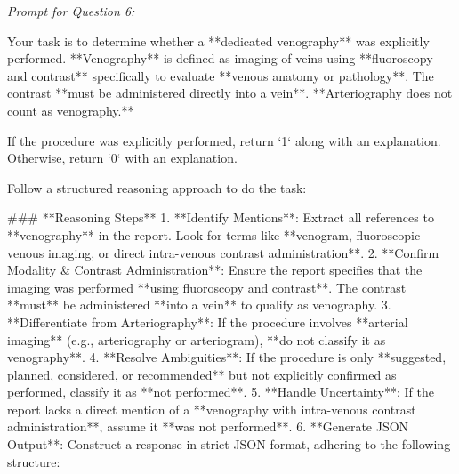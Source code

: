 \textit{\normalsize Prompt for Question  6:}
\begin{mdframed}[]
\normalsize

Your task is to determine whether a **dedicated venography** was explicitly performed. **Venography** is defined as imaging of veins using **fluoroscopy and contrast** specifically to evaluate **venous anatomy or pathology**. The contrast **must be administered directly into a vein**. **Arteriography does not count as venography.** 

If the procedure was explicitly performed, return `1` along with an explanation. Otherwise, return `0` with an explanation.

Follow a structured reasoning approach to do the task:

### **Reasoning Steps**  
1. **Identify Mentions**: Extract all references to **venography** in the report. Look for terms like **venogram, fluoroscopic venous imaging, or direct intra-venous contrast administration**.  
2. **Confirm Modality & Contrast Administration**: Ensure the report specifies that the imaging was performed **using fluoroscopy and contrast**. The contrast **must** be administered **into a vein** to qualify as venography.  
3. **Differentiate from Arteriography**: If the procedure involves **arterial imaging** (e.g., arteriography or arteriogram), **do not classify it as venography**.  
4. **Resolve Ambiguities**: If the procedure is only **suggested, planned, considered, or recommended** but not explicitly confirmed as performed, classify it as **not performed**.  
5. **Handle Uncertainty**: If the report lacks a direct mention of a **venography with intra-venous contrast administration**, assume it **was not performed**.  
6. **Generate JSON Output**: Construct a response in strict JSON format, adhering to the following structure:  
\end{mdframed}

